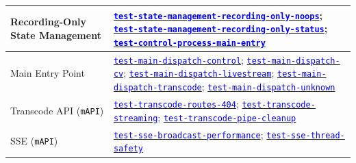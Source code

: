 \documentclass[12pt, titlepage]{article}
\newcommand{\mref}[1]{\texttt{#1}}
\newcommand{\tid}[1]{\hyperlink{tid:#1}{\textcolor{blue}{\texttt{#1}}}}
\begin{document}
\begin{longtable}{|p{4.5cm}|p{10cm}|}
  \hline
  Recording-Only State Management                    & \tid{test-state-management-recording-only-noops}; \tid{test-state-management-recording-only-status}; \tid{test-control-process-main-entry}                                                                                                                                                \\
  \hline
  Main Entry Point                                   & \tid{test-main-dispatch-control}; \tid{test-main-dispatch-cv}; \tid{test-main-dispatch-livestream}; \tid{test-main-dispatch-transcode}; \tid{test-main-dispatch-unknown}                                                                                                                  \\
  \hline
  Transcode API (\mref{mAPI})                        & \tid{test-transcode-routes-404}; \tid{test-transcode-streaming}; \tid{test-transcode-pipe-cleanup}                                                                                                                                                                                        \\
  \hline
  SSE (\mref{mAPI})                                  & \tid{test-sse-broadcast-performance}; \tid{test-sse-thread-safety}                                                                                                                                                                                                                        \\
\end{longtable}
\end{document}
